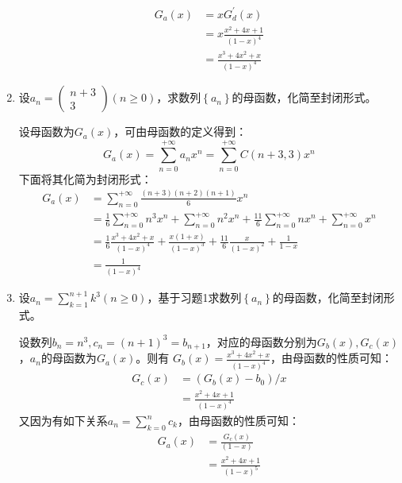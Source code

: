 \documentclass[a4paper]{article}
\begin{document}
\begin{enumerate}
\begin{solution}
    \begin{equation}
        \begin{aligned}
        G_a(x)&=xG_d^\prime(x)\\
        &=x\frac{x^2+4x+1}{(1-x)^4}\\
        &=\frac{x^3+4x^2+x}{(1-x)^4}
        \end{aligned}
    \end{equation}
  \end{solution}
  \item 设$a_n=\begin{pmatrix}
  n+3 \\ 3
  \end{pmatrix}(n\geqslant 0)$，求数列$\left\{a_n\right\}$的母函数，化简至封闭形式。
  \begin{solution}
  设母函数为$G_a(x)$，可由母函数的定义得到：
  $$G_a(x) = \sum\limits_{n=0}^{+\infty }a_nx^n=\sum\limits_{n=0}^{+\infty}C(n+3,3)x^n$$
  下面将其化简为封闭形式：
  \begin{equation}
  \begin{aligned}
  G_a(x) &= \sum\limits_{n=0}^{+\infty}\frac{(n+3)(n+2)(n+1)}{6}x^n\\
  &=\frac{1}{6}\sum\limits_{n=0}^{+\infty}n^3x^n+\sum\limits_{n=0}^{+\infty}n^2x^n+\frac{11}{6}\sum\limits_{n=0}^{+\infty}nx^n+\sum\limits_{n=0}^{+\infty}x^n\\
  &=\frac{1}{6}\frac{x^3+4x^2+x}{(1-x)^4}+\frac{x(1+x)}{(1-x)^3}+\frac{11}{6}\frac{x}{(1-x)^2}+\frac{1}{1-x}\\
  &=\frac{1}{(1-x)^4}
  \end{aligned}
  \end{equation}


  \end{solution}
  \item 设$a_n=\sum\limits_{k=1}^{n+1}k^3(n\geqslant 0)$，基于习题1求数列$\left\{a_n\right\}$的母函数，化简至封闭形式。
  \begin{solution}
    设数列$b_n = n^3,c_n = (n+1)^3=b_{n+1}$，对应的母函数分别为$G_b(x),G_c(x)$，$a_n$的母函数为$G_a(x)$。则有
    $G_b(x)=\frac{x^3+4x^2+x}{(1-x)^4}$，由母函数的性质可知：
    \begin{equation}
        \begin{aligned}
        G_c(x) &= (G_b(x)-b_0)/x\\
        &=\frac{x^2+4x+1}{(1-x)^4}
        \end{aligned}
    \end{equation}
    又因为有如下关系$a_n = \sum\limits_{k=0}^{n}c_k$，由母函数的性质可知：
    \begin{equation}
        \begin{aligned}
        G_a(x) &= \frac{G_c(x)}{(1-x)}\\
        &=\frac{x^2+4x+1}{(1-x)^5}
        \end{aligned}
    \end{equation}


\end{solution}
\end{enumerate}
\end{document}
